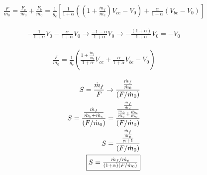 \begin{align*}
    \frac{F}{\dot{m}_0}=\frac{F_c}{\dot{m}_0}+\frac{F_b}{\dot{m}_0}=\frac{1}{g_c}\left[\frac{1}{1+\alpha}\left(
    \left(1+\frac{\dot{m}_f}{\dot{m}_c}\right)V_{ce}-V_0\right) + \frac{\alpha}{1+\alpha}\left(V_{be}-V_0\right)\right]
\end{align*}

\begin{align*}
    -\frac{1}{1+\alpha}V_0-\frac{\alpha}{1+\alpha}V_0 \rightarrow \frac{-1-\alpha}{1+\alpha}V_0 \rightarrow
    -\frac{(1+\alpha)}{1+\alpha}V_0=-V_0
\end{align*}

\begin{align*}
    \frac{F}{\dot{m}_0}=\frac{1}{g_c}\left(\frac{1+\frac{\dot{m}_f}{\dot{m}_c}}{1+\alpha}V_{ce} +
    \frac{\alpha}{1+\alpha}V_{be}-V_0\right)
\end{align*}

\begin{align*}
    S=\frac{\dot{m}_f}{F}\rightarrow \frac{\frac{\dot{m}_f}{\dot{m}_0}}{(F/\dot{m}_0)} \\
    S=\frac{\frac{\dot{m}_f}{\dot{m}_b+\dot{m}_c}}{(F/\dot{m}_0)}=
    \frac{\frac{\frac{\dot{m}_f}{\dot{m}_c}}{\frac{\dot{m}_b}{\dot{m}_c}+\frac{\dot{m}_c}{\dot{m}_c}}}{(F/\dot{m}_0)} \\
    S=\frac{\frac{\frac{\dot{m}_f}{\dot{m}_c}}{\alpha+1}}{(F/\dot{m}_0)} \\
    \fbox{$S=\frac{\dot{m}_f/\dot{m_c}}{(1+\alpha)(F/\dot{m}_0)}$}
\end{align*}